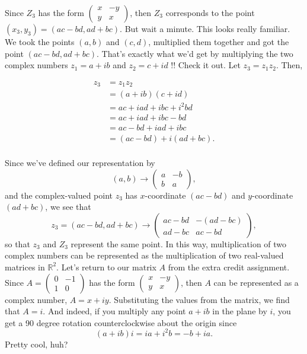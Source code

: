 \documentclass{article}
\begin{document}
Since $Z_3$ has the form $\begin{pmatrix}x & -y\\y & x\end{pmatrix}$, then $Z_3$ corresponds to the point $\left(x_3, y_3\right) = \left(ac - bd, ad + bc \right)$. But wait a minute. This looks really familiar. We took the points $\left(a, b\right)$ and $\left(c, d\right)$, multiplied them together and got the point $\left( ac - bd, ad + bc\right)$. That's exactly what we'd get by multiplying the two complex numbers $z_1 = a + ib$ and $z_2 = c + id$ !! Check it out. Let $z_3 = z_1 z_2$. Then,

\begin{align*}
z_3 &= z_1 z_2\\
&= \left(a + ib\right)\left(c + id\right)\\
&= ac + iad + ibc + i^2bd\\
&= ac + iad + ibc - bd\\
&= ac - bd + iad + ibc\\
&= \left(ac - bd\right) + i\left(ad + bc\right).\\
\end{align*}

Since we've defined our representation by $$\left(a, b\right) \rightarrow \begin{pmatrix}a & -b\\b & a\end{pmatrix},$$ and the complex-valued point $z_3$ has $x$-coordinate $\left(ac - bd\right)$ and $y$-coordinate $\left( ad + bc\right)$, we see that $$z_3 = \left(ac - bd, ad+ bc\right) \rightarrow \begin{pmatrix}ac - bd & -\left(ad - bc\right)\\ad - bc & ac - bd\end{pmatrix},$$ so that $z_3$ and $Z_3$ represent the same point. In this way, multiplication of two complex numbers can be represented as the multiplication of two real-valued matrices in $\mathbb{R}^2$. Let's return to our matrix $A$ from the extra credit assignment.\\

Since $A = \begin{pmatrix}0 & -1 \\ 1 & 0\end{pmatrix}$ has the form $\begin{pmatrix}x & -y \\ y & x\end{pmatrix}$, then $A$ can be represented as a complex number, $A = x + iy$. Substituting the values from the matrix, we find that $A = i.$ And indeed, if you multiply any point $a + ib$ in the plane by $i$, you get a 90 degree rotation counterclockwise about the origin since $$\left(a + ib\right)i = ia + i^2b = -b + ia.$$ 
Pretty cool, huh?
\end{document}
